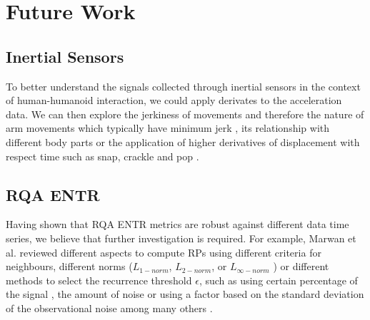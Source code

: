 \documentclass[fleqn,10pt]{wlscirep}
\begin{document}


%


%
%



\section*{Future Work}

\subsection*{Inertial Sensors}
To better understand the signals collected through 
inertial sensors in the context of human-humanoid interaction, 
we could apply derivates to the acceleration data. 
We can then explore the jerkiness of movements and therefore 
the nature of arm movements which typically have 
minimum jerk \cite{flash1985}, its relationship with different body 
parts \cite{devries1982, mori2012} or the application of higher derivatives 
of displacement with respect time such as snap, crackle and pop \cite{eager2016}.

\subsection*{RQA ENTR}
Having shown that RQA ENTR metrics are robust against different data
time series, we believe that further investigation is required. 
For example, Marwan et al. \cite{marwan2007, marwan2015} reviewed 
different aspects to compute RPs using different criteria for neighbours, 
different norms ($L_{1-norm}$, $L_{2-norm}$, or $L_{\infty-norm}$ ) or 
different methods to select the recurrence threshold $\epsilon$, 
such as using certain percentage of the signal \cite{letellier2006}, 
the amount of noise or using a factor based on the standard deviation 
of the observational noise among many others \cite{marwan2007}.
\end{document}
